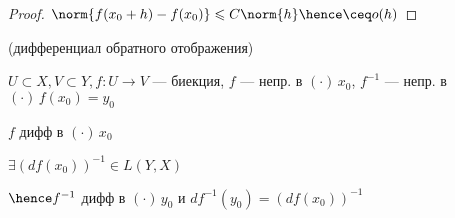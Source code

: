 \begin{properties}{}
\begin{proof}
        $\norm{f(x_0 + h) - f(x_0)} \leqslant C \norm{h} \hence \ceq o(h)$
    \end{proof}

    \item (дифференциал обратного отображения)
    
    $U \subset X, V \subset Y, f : U \to V $ --- биекция, $f $ --- непр. в $(\cdot)\, x_0$, $f^{-1}$ --- непр. в $(\cdot)\, f(x_0) = y_0$ 

    $f$ дифф в $(\cdot) \, x_0$

    $\exists (df(x_0))^{-1} \in L(Y, X)$

    $\hence f^{-1}$ дифф в $(\cdot)\, y_0$ и $df^{-1}(y_0) = (df(x_0)) ^ {-1}$
\end{properties}
